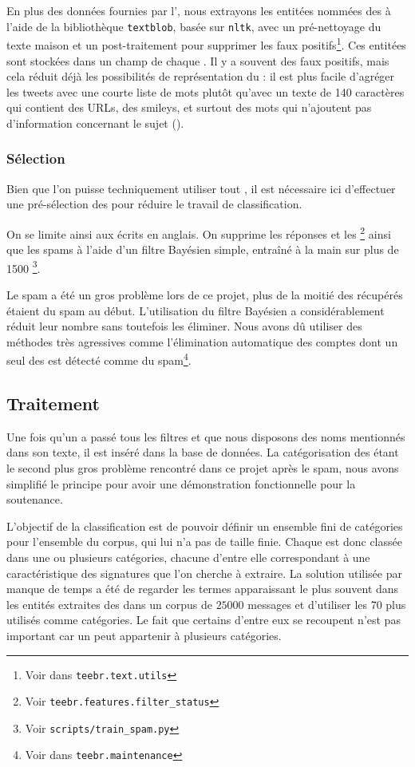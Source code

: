 En plus des données fournies par l’\api{}, nous extrayons les entitées nommées
des \tweets{} à l’aide de la bibliothèque \verb|textblob|, basée sur
\verb|nltk|, avec un pré-nettoyage du texte maison et un post-traitement pour
supprimer les faux positifs\footnote{Voir dans \verb|teebr.text.utils|}. Ces
entitées sont stockées dans un champ de chaque \tweet{}. Il y a souvent des
faux positifs, mais cela réduit déjà les possibilités de représentation du
\tweet{} : il est plus facile d’agréger les tweets avec une courte liste de
mots plutôt qu’avec un texte de 140 caractères qui contient des URLs, des
smileys, et surtout des mots qui n’ajoutent pas d’information concernant le
sujet ().

\subsubsection{Sélection}

Bien que l’on puisse techniquement utiliser tout \tweet{}, il est nécessaire
ici d’effectuer une pré-sélection des \tweets{} pour réduire le travail de
classification.

On se limite ainsi aux \tweets{} écrits en anglais. On supprime les réponses
et les \rts{}\footnote{Voir \verb|teebr.features.filter_status|} ainsi que les
spams à l’aide d’un filtre Bayésien simple, entraîné à la main sur plus de 1500
\tweets{}\footnote{Voir \verb|scripts/train_spam.py|}.

Le spam a été un gros problème lors de ce projet, plus de la moitié des
\tweets{} récupérés étaient du spam au début. L’utilisation du filtre Bayésien
a considérablement réduit leur nombre sans toutefois les éliminer. Nous avons
dû utiliser des méthodes très agressives comme l’élimination automatique des
comptes dont un seul des \tweets{} est détecté comme du spam\footnote{Voir dans
\verb|teebr.maintenance|}.

\subsection{Traitement}

Une fois qu’un \tweet{} a passé tous les filtres et que nous disposons des noms
mentionnés dans son texte, il est inséré dans la base de données. La
catégorisation des \tweets{} étant le second plus gros problème rencontré dans
ce projet après le spam, nous avons simplifié le principe pour avoir une
démonstration fonctionnelle pour la soutenance.

L’objectif de la classification est de pouvoir définir un ensemble fini de
catégories pour l’ensemble du corpus, qui lui n’a pas de taille finie. Chaque
\tweet{} est donc classée dans une ou plusieurs catégories, chacune d’entre
elle correspondant à une caractéristique des signatures que l’on cherche à
extraire. La solution utilisée par manque de temps a été de regarder les termes
apparaissant le plus souvent dans les entités extraites des \tweets{} dans un
corpus de $25000$ messages et d’utiliser les 70 plus utilisés comme catégories.
Le fait que certains d’entre eux se recoupent n’est pas important car un
\tweet{} peut appartenir à plusieurs catégories.

